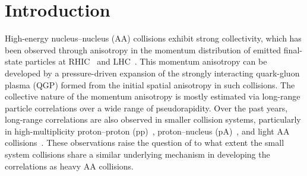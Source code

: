 
\section{Introduction}
\label{sec:intro}

High-energy nucleus--nucleus (AA) collisions exhibit strong collectivity, which has been observed through anisotropy in the momentum distribution of emitted final-state particles at RHIC~\cite{Adams:2005dq,Adcox:2004mh,Arsene:2004fa,Back:2004je} and LHC~\cite{Abelev:2012di, Abelev:2014pua, ATLAS:2011ah}. This momentum anisotropy can be developed by a pressure-driven expansion of the strongly interacting quark-gluon plasma (QGP) formed from the initial spatial anisotropy in such collisions.
The collective nature of the momentum anisotropy is mostly estimated via long-range particle correlations over a wide range of pseudorapidity. Over the past years, long-range correlations are also observed in smaller collision systems, particularly in high-multiplicity proton--proton (pp)~\cite{ATLAS:2015hzw,Khachatryan:2015lva,Khachatryan:2016txc,Acharya:2019vdf,ATLAS:2017rtr}, proton--nucleus (pA)~\cite{ALICE:2012eyl,ATLAS:2014qaj,ATLAS:2016yzd,Khachatryan:2016ibd}, and light AA collisions~\cite{PHENIX:2018lia,Aidala:2017ajz}. These observations raise the question of to what extent the small system collisions share a similar underlying mechanism in developing the correlations as heavy AA collisions.

